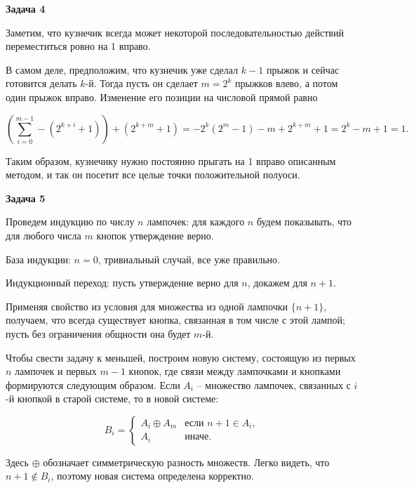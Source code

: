 \begin{center}
\textbf{Задача 4}
\end{center}    Заметим, что кузнечик всегда может некоторой последовательностью действий переместиться ровно на 1 вправо.

    В самом деле, предположим, что кузнечик уже сделал $k - 1$ прыжок и сейчас готовится делать $k$-й. Тогда пусть он сделает $m = 2^k$ прыжков влево, а потом один прыжок вправо. Изменение его позиции на числовой прямой равно

    \begin{equation*}
        \left( \sum_{i=0}^{m-1} -(2^{k+i} + 1) \right) + (2^{k+m} + 1) = -2^k (2^m - 1) - m + 2^{k+m} + 1 = 2^k - m + 1 = 1.
    \end{equation*}

    Таким образом, кузнечику нужно постоянно прыгать на 1 вправо описанным методом, и так он посетит все целые точки положительной полуоси.


\begin{center}
\textbf{Задача 5}
\end{center}    Проведем индукцию по числу $n$ лампочек: для каждого $n$ будем показывать, что для любого числа $m$ кнопок утверждение верно.

    База индукции: $n = 0$, тривиальный случай, все уже правильно.

    Индукционный переход: пусть утверждение верно для $n$, докажем для $n + 1$.

    Применяя свойство из условия для множества из одной лампочки $\{n + 1\}$, получаем, что всегда существует кнопка, связанная в том числе с этой лампой; пусть без ограничения общности она будет $m$-й.

    Чтобы свести задачу к меньшей, построим новую систему, состоящую из первых $n$ лампочек и первых $m - 1$ кнопок, где связи между лампочками и кнопками формируются следующим образом. Если $A_i$ -- множество лампочек, связанных с $i$-й кнопкой в старой системе, то в новой системе:

    \begin{equation*}
        B_i = \begin{cases}
                  A_i \oplus A_m & \text{если } n + 1 \in A_i, \\
                  A_i & \text{иначе.}
        \end{cases}
    \end{equation*}

    Здесь $\oplus$ обозначает симметрическую разность множеств. Легко видеть, что $n + 1 \not\in B_i$, поэтому новая система определена корректно.

